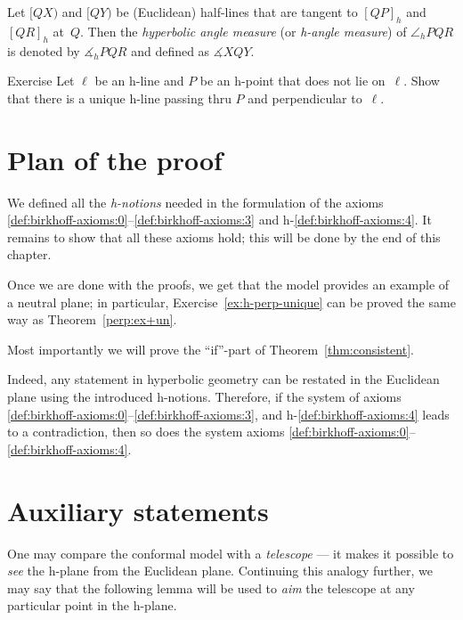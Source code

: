 Let $[QX)$ and $[QY)$ be (Euclidean) half-lines 
that are tangent to $[QP]_h$ and $[QR]_h$ 
at~$Q$.
Then the \emph{hyperbolic angle measure} (or \emph{h-angle measure}) of $\angle_h PQR$ is denoted by
$\measuredangle_h PQR$ and defined as
$\measuredangle XQY$.

\begin{thm}{Exercise}\label{ex:h-perp-unique}
Let $\ell$ be an h-line and $P$ be an h-point that does not lie on~$\ell$.
Show that there is a unique h-line passing thru $P$ 
and perpendicular to~$\ell$.
\end{thm}

\section*{Plan of the proof}

We defined all the {}\emph{h-notions} needed in the formulation of the axioms \ref{def:birkhoff-axioms:0}--\ref{def:birkhoff-axioms:3} and h-\ref{def:birkhoff-axioms:4}.
It remains to show that all these axioms hold; 
this will be done by the end of this chapter.

Once we are done with the proofs, 
we get that the model provides an example of a neutral plane; 
in particular, Exercise~\ref{ex:h-perp-unique} can be proved the same way as Theorem~\ref{perp:ex+un}.

Most importantly we will prove the ``if''-part of Theorem~\ref{thm:consistent}.

Indeed, any statement in hyperbolic geometry can be restated in the Euclidean plane using the introduced h-notions.
Therefore, if the system of axioms \ref{def:birkhoff-axioms:0}--\ref{def:birkhoff-axioms:3}, and h-\ref{def:birkhoff-axioms:4} leads to a contradiction, then so does the system axioms \ref{def:birkhoff-axioms:0}--\ref{def:birkhoff-axioms:4}.

\section*{Auxiliary statements}

One may compare the conformal model with a {}\emph{telescope} --- it makes it possible to {}\emph{see} the h-plane from the Euclidean plane.
Continuing this analogy further, we may say that the following lemma will be used to {}\emph{aim} the telescope at any particular point in the h-plane.

